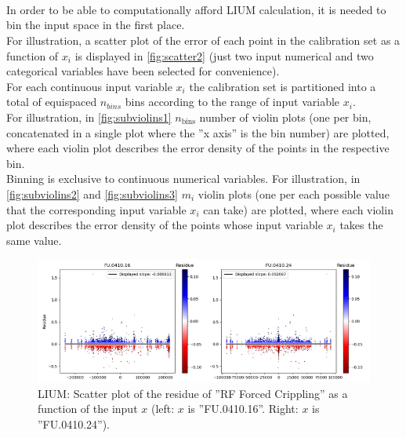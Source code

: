 \paragraph{ \\}
In order to be able to computationally afford LIUM calculation, it is needed to bin the input space in the first place.\\
\indent For illustration, a scatter plot of the error of each point in the calibration set as a function of $x_i$ is displayed in \autoref{fig:scatter2} (just two input numerical and two categorical variables have been selected for convenience).\\
\indent For each continuous input variable $x_i$ the calibration set is partitioned into a total of equispaced $n_{bins}$ bins according to the range of input variable $x_i$.\\
\indent For illustration, in \autoref{fig:subviolins1} $n_{\text{bins}}$ number of violin plots (one per bin, concatenated in a single plot where the ''x axis'' is the bin number) are plotted, where each violin plot describes the error density of the points in the respective bin.\\
\indent Binning is exclusive to continuous numerical variables. For illustration, in \autoref{fig:subviolins2} and \autoref{fig:subviolins3} $m_i$ violin plots (one per each possible value that the corresponding input variable $x_i$ can take) are plotted, where each violin plot describes the error density of the points whose input variable $x_i$ takes the same value.\\
%
\begin{figure}[!htb]
	\centering
	\includegraphics[width=\textwidth]{Figures/uncertainty/scatter2.png}
	\caption{LIUM: Scatter plot of the residue of ''RF Forced Crippling'' as a function of the input $x$ (left: $x$ is ''FU.0410.16''. Right: $x$ is ''FU.0410.24'').}
	\label{fig:scatter2}
\end{figure}


